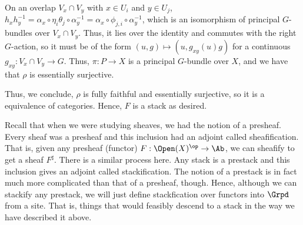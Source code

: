 \begin{example}
On an overlap \( V_x \cap V_y \) with \( x \in U_i \) and \( y \in U_j \), \( h_x h_y^{-1} = \alpha_x \circ \eta_i\theta_j \circ \alpha_y^{-1} = \alpha_x \circ \phi_{j,i} \circ \alpha_y^{-1} \), which is an isomorphism of principal \( G \)-bundles over \( V_x \cap V_y \). Thus, it lies over the identity and commutes with the right \( G \)-action, so it must be of the form \( (u,g) \mapsto (u,g_{xy}(u)g) \) for a continuous \( g_{xy}: V_x \cap V_y \to G \). Thus, \( \pi: P \to X \) is a principal \( G \)-bundle over \( X \), and we have that \( \rho \) is essentially surjective.

Thus, we conclude, \( \rho \) is fully faithful and essentially surjective, so it is a equivalence of categories. Hence, \( F \) is a stack as desired.
\end{example}

Recall that when we were studying sheaves, we had the notion of a presheaf. Every sheaf was a presheaf and this inclusion had an adjoint called sheafification. That is, given any presheaf (functor) \( F: \Open(X)^\op \to \Ab \), we can sheafify to get a sheaf \( F^\sharp \). There is a similar process here. Any stack is a prestack and this inclusion gives an adjoint called stackification. The notion of a prestack is in fact much more complicated than that of a presheaf, though. Hence, although we can stackify any prestack, we will just define stackfication over functors into \( \Grpd \) from a site. That is, things that would feasibly descend to a stack in the way we have described it above.

